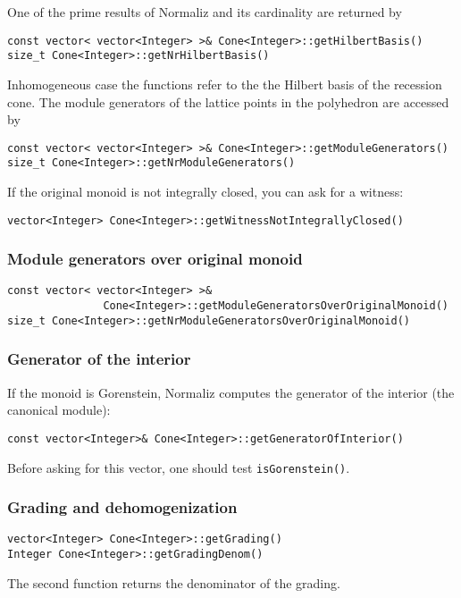 \begin{small}
One of the prime results of Normaliz and its cardinality are returned by
\begin{Verbatim}
const vector< vector<Integer> >& Cone<Integer>::getHilbertBasis()
size_t Cone<Integer>::getNrHilbertBasis()
\end{Verbatim}
Inhomogeneous case the functions refer to the the Hilbert basis of the recession cone. The module generators of the lattice points in the polyhedron are accessed by
\begin{Verbatim}
const vector< vector<Integer> >& Cone<Integer>::getModuleGenerators()
size_t Cone<Integer>::getNrModuleGenerators()
\end{Verbatim}

If the original monoid is not integrally closed, you can ask for a witness:
\begin{Verbatim}
vector<Integer> Cone<Integer>::getWitnessNotIntegrallyClosed()
\end{Verbatim}

\subsubsection{Module generators over original monoid}

\begin{Verbatim}
const vector< vector<Integer> >& 
               Cone<Integer>::getModuleGeneratorsOverOriginalMonoid()
size_t Cone<Integer>::getNrModuleGeneratorsOverOriginalMonoid()
\end{Verbatim}

\subsubsection{Generator of the interior}\label{GenInt}

If the monoid is Gorenstein, Normaliz computes the generator of the interior (the canonical module):
\begin{Verbatim}
const vector<Integer>& Cone<Integer>::getGeneratorOfInterior()
\end{Verbatim}
Before asking for this vector, one should test \verb|isGorenstein()|.

\subsubsection{Grading and dehomogenization}

\begin{Verbatim}
vector<Integer> Cone<Integer>::getGrading()
Integer Cone<Integer>::getGradingDenom()
\end{Verbatim}
The second function returns the denominator of the grading.


\end{small}
